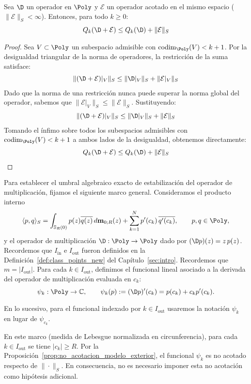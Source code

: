 \begin{prop}\label{prop:Qk_perturbacion}
	Sea $\D$ un operador en $\Poly$ y $\mathcal{E}$ un operador acotado en el mismo espacio ($\|\mathcal{E}\|_S < \infty$). Entonces, para todo $k \ge 0$:
	$$ Q_k(\D + \mathcal{E}) \le Q_k(\D) + \|\mathcal{E}\|_S $$
\end{prop}

\begin{proof}
	Sea $V \subset \Poly$ un subespacio admisible con $\operatorname{codim}_{\Poly}(V) < k+1$. Por la desigualdad triangular de la norma de operadores, la restricción de la suma satisface:
	$$ \|(\D + \mathcal{E})|_V\|_S \le \|\D|_V\|_S + \|\mathcal{E}|_V\|_S $$
	Dado que la norma de una restricción nunca puede superar la norma global del operador, sabemos que $\|\mathcal{E}|_V\|_S \le \|\mathcal{E}\|_S$. Sustituyendo:
	$$ \|(\D + \mathcal{E})|_V\|_S \le \|\D|_V\|_S + \|\mathcal{E}\|_S $$
	Tomando el ínfimo sobre todos los subespacios admisibles con $\operatorname{codim}_{\Poly}(V)<k+1$ a ambos lados de la desigualdad, obtenemos directamente:
	$$ Q_k(\D + \mathcal{E}) \le Q_k(\D) + \|\mathcal{E}\|_S $$
\end{proof}

Para establecer el umbral algebraico exacto de estabilización del operador de multiplicación, fijamos el siguiente marco general. Consideramos el producto interno
\[
	\langle p,q\rangle_S
	=
	\int_{\mathbb{S}_R(0)} p(z)\overline{q(z)} \, d\mathbf{m}_{0;R}(z)
	+
	\sum_{k=1}^N p'(c_k)\,\overline{q'(c_k)},
	\qquad p,q\in\Poly,
\]
y el operador de multiplicación $\D:\Poly\to\Poly$ dado por $(\D p)(z)=z\,p(z)$.
Recordemos que $I_{\mathrm{in}}$ e $I_{\mathrm{out}}$ fueron definidos en la Definición~\ref{def:class_points_new} del Capítulo~\ref{sec:intro}.
Recordemos que $m=|I_{\mathrm{out}}|$.
Para cada $k\in I_{\mathrm{out}}$, definimos el funcional lineal asociado a la derivada del operador de multiplicación evaluada en $c_k$:
\[
	\psi_k:\Poly\to\mathbb C,
	\qquad
	\psi_k(p):=(\D p)'(c_k)=p(c_k)+c_kp'(c_k).
\]

\begin{rmk}
	En lo sucesivo, para el funcional indexado por $k \in I_{\mathrm{out}}$ usaremos la notación $\psi_k$ en lugar de $\psi_{c_k}$.
\end{rmk}

\begin{cor}\label{cor:no_acotacion_psi_k}
	En este marco (medida de Lebesgue normalizada en circunferencia), para cada $k\in I_{\mathrm{out}}$ se tiene $|c_k|\ge R$. Por la Proposición~\ref{prop:no_acotacion_modelo_exterior}, el funcional $\psi_k$ es no acotado respecto de $\|\cdot\|_S$. En consecuencia, no es necesario imponer esta no acotación como hipótesis adicional.
\end{cor}

